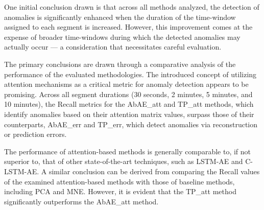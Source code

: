 \documentclass[conference]{IEEEtran}
\begin{document}
One initial conclusion drawn is that across all methods analyzed, the detection of anomalies is significantly enhanced when the duration of the time-window assigned to each segment is increased. However, this improvement comes at the expense of broader time-windows during which the detected anomalies may actually occur — a consideration that necessitates careful evaluation. 

The primary conclusions are drawn through a comparative analysis of the performance of the evaluated methodologies. The introduced concept of utilizing attention mechanisms as a critical metric for anomaly detection appears to be promising. Across all segment durations (30 seconds, 2 minutes, 5 minutes, and 10 minutes), the Recall metrics for the AbAE\_att and TP\_att methods, which identify anomalies based on their attention matrix values, surpass those of their counterparts, AbAE\_err and TP\_err, which detect anomalies via reconstruction or prediction errors.

The performance of attention-based methods is generally comparable to, if not superior to, that of other state-of-the-art techniques, such as LSTM-AE and C-LSTM-AE. A similar conclusion can be derived from comparing the Recall values of the examined attention-based methods with those of baseline methods, including PCA and MNE. However, it is evident that the TP\_att method significantly outperforms the AbAE\_att method.
\end{document}

